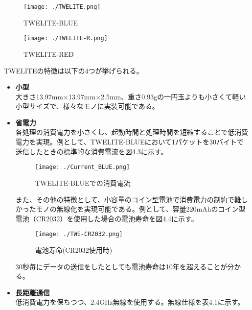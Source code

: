 \documentclass{thesis}
\begin{document}
\begin{figure}[htbp]
  \begin{minipage}[b]{0.45\linewidth}
    \centering
    \texttt{[image: ./TWELITE.png]}
    \caption{TWELITE-BLUE}
  \end{minipage}
  \begin{minipage}[b]{0.45\linewidth}
    \centering
    \texttt{[image: ./TWELITE-R.png]}
    \caption{TWELITE-RED}
  \end{minipage}
\end{figure}

TWELITEの特徴は以下の4つが挙げられる。

\begin{itemize}
\item \textbf{小型} \\ 
大きさ13.97mm$\times$13.97mm$\times$2.5mm、重さ0.93gの一円玉よりも小さくて軽い小型サイズで、様々なモノに実装可能である。 
\item \textbf{省電力} \\ 
各処理の消費電力を小さくし、起動時間と処理時間を短縮することで低消費電力を実現。例として、TWELITE-BLUEにおいて1パケットを30バイトで送信したときの標準的な消費電流を図4.3に示す。

\begin{figure}[H]
 \center
 \texttt{[image: ./Current\_BLUE.png]}
 \caption{TWELITE-BLUEでの消費電流}
\end{figure}

また、その他の特徴として、小容量のコイン型電池で消費電力の制約で難しかったモノの無線化を実現可能である。例として、容量220mAhのコイン型電池（CR2032）を使用した場合の電池寿命を図4.4に示す。

\begin{figure}[H]
 \center
 \texttt{[image: ./TWE-CR2032.png]}
 \caption{電池寿命(CR2032使用時)}
\end{figure}

30秒毎にデータの送信をしたとしても電池寿命は10年を超えることが分かる。

\item \textbf{長距離通信} \\ 
低消費電力を保ちつつ、2.4GHz無線を使用する。無線仕様を表4.1に示す。


\end{itemize}
\end{document}
